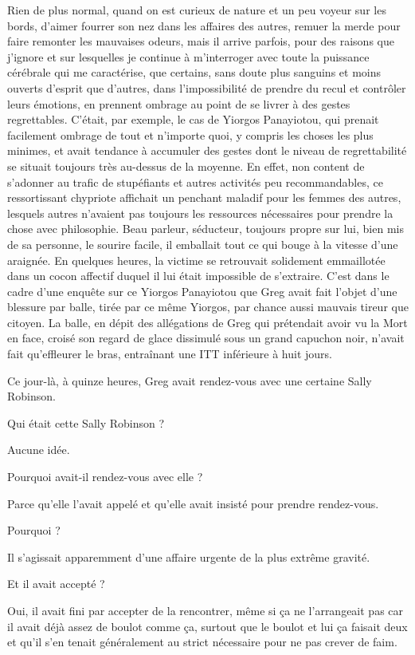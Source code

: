Rien de plus normal, quand on est curieux de nature et un peu voyeur sur les bords, d’aimer fourrer son nez dans les affaires des autres, remuer la merde pour faire remonter les mauvaises odeurs, mais il arrive parfois, pour des raisons que j’ignore et sur lesquelles je continue à m’interroger avec toute la puissance cérébrale qui me caractérise, que certains, sans doute plus sanguins et moins ouverts d’esprit que d’autres, dans l’impossibilité de prendre du recul et contrôler leurs émotions, en prennent ombrage au point de se livrer à des gestes regrettables. C’était, par exemple, le cas de Yiorgos Panayiotou, qui prenait facilement ombrage de tout et n’importe quoi, y compris les choses les plus minimes, et avait tendance à accumuler des gestes dont le niveau de regrettabilité se situait toujours très au-dessus de la moyenne. En effet, non content de s’adonner au trafic de stupéfiants et autres activités peu recommandables, ce ressortissant chypriote affichait un penchant maladif pour les femmes des autres, lesquels autres n’avaient pas toujours les ressources nécessaires pour prendre la chose avec philosophie. Beau parleur, séducteur, toujours propre sur lui, bien mis de sa personne, le sourire facile, il emballait tout ce qui bouge à la vitesse d’une araignée. En quelques heures, la victime se retrouvait solidement emmaillotée dans un cocon affectif duquel il lui était impossible de s’extraire. C’est dans le cadre d’une enquête sur ce Yiorgos Panayiotou que Greg avait fait l’objet d’une blessure par balle, tirée par ce même Yiorgos, par chance aussi mauvais tireur que citoyen. La balle, en dépit des allégations de Greg qui prétendait avoir vu la Mort en face, croisé son regard de glace dissimulé sous un grand capuchon noir, n’avait fait qu’effleurer le bras, entraînant une ITT inférieure à huit jours.

Ce jour-là, à quinze heures, Greg avait rendez-vous avec une certaine Sally Robinson.

Qui était cette Sally Robinson ?

Aucune idée.

Pourquoi avait-il rendez-vous avec elle ?

Parce qu’elle l’avait appelé et qu’elle avait insisté pour prendre rendez-vous.

Pourquoi ?

Il s’agissait apparemment d’une affaire urgente de la plus extrême gravité.

Et il avait accepté ?

Oui, il avait fini par accepter de la rencontrer, même si ça ne l’arrangeait pas car il avait déjà assez de boulot comme ça, surtout que le boulot et lui ça faisait deux et qu’il s’en tenait généralement au strict nécessaire pour ne pas crever de faim.

